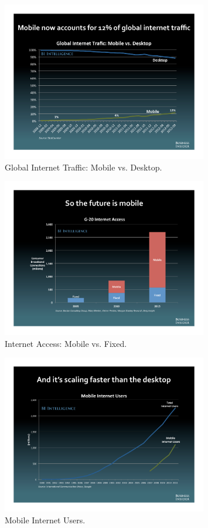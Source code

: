 \documentclass[journal,onecolumn,12pt]{IEEEtran}
\begin{document}
\begin{figure}
\centering
\includegraphics[width=0.8\textwidth]{mobile_desktop.pdf}
\caption{Global Internet Traffic: Mobile vs. Desktop.}
\label{fig:mobile_desktop}
\end{figure}

\begin{figure}
\centering
\includegraphics[width=0.8\textwidth]{mobile_trend.pdf}
\caption{Internet Access: Mobile vs. Fixed.}
\label{fig:mobile_trend}
\end{figure}

\begin{figure}
\centering
\includegraphics[width=0.8\textwidth]{mobile_users.pdf}
\caption{Mobile Internet Users.}
\label{fig:mobile_users}
\end{figure}
\end{document}
